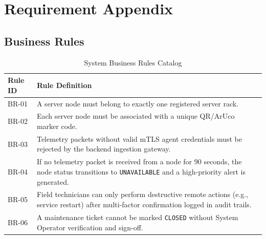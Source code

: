 \section{Requirement Appendix}

\subsection{Business Rules}
\begin{table}[H]
    \centering
    \caption{System Business Rules Catalog}
    \begin{tabular}{|l|p{12cm}|}
        \hline
        \textbf{Rule ID} & \textbf{Rule Definition} \\ \hline
        BR-01 & A server node must belong to exactly one registered server rack. \\ \hline
        BR-02 & Each server node must be associated with a unique QR/ArUco marker code. \\ \hline
        BR-03 & Telemetry packets without valid mTLS agent credentials must be rejected by the backend ingestion gateway. \\ \hline
        BR-04 & If no telemetry packet is received from a node for 90 seconds, the node status transitions to \texttt{UNAVAILABLE} and a high-priority alert is generated. \\ \hline
        BR-05 & Field technicians can only perform destructive remote actions (e.g., service restart) after multi-factor confirmation logged in audit trails. \\ \hline
        BR-06 & A maintenance ticket cannot be marked \texttt{CLOSED} without System Operator verification and sign-off. \\ \hline
    \end{tabular}
\end{table}
